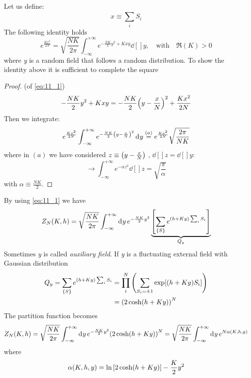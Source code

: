 \documentclass[../main/main.tex]{subfiles}
\begin{document}
Let us define:
\begin{equation}
 x \equiv \sum_{i}^{} S_i
\end{equation}
The following identity holds
\begin{equation}
  e^{\frac{K x^2}{2N}} =  \sqrt{\frac{N K}{2 \pi }} \int_{-\infty }^{+\infty } e^{-\frac{N K}{2}y^2+Kxy} \dd[]{y}, \quad \text{with} \quad \Re(K) >0
  \label{eq:11_1}
\end{equation}
where \emph{y} is a random field that follows a random distribution.
To show the identity above it is sufficient to complete the square
\begin{proof}(of \eqref{eq:11_1})
  \begin{equation}
    - \frac{N K}{2} y^2 + K x y = - \frac{N K}{2} \qty(y - \frac{x}{N})^2 + \frac{K x^2}{2N}
  \end{equation}
  Then we integrate:
  \begin{equation}
    e^{\frac{K x^2}{2N}} \int_{- \infty }^{+ \infty } e^{- \frac{N K}{2} \qty(y - \frac{x}{N})^2 } \dd[]{y} \overset{(a)}{=}  e^{\frac{K x^2}{2N}} \sqrt{\frac{2 \pi }{N K}}
  \end{equation}
  where in \( (a) \) we have considered \( z \equiv \qty( y - \frac{x}{N} )\) , \( \dd[]{z} = \dd[]{y}   \):
  \begin{equation}
    \rightarrow \int_{-\infty }^{+\infty } e^{- \alpha z^2} \dd[]{z} = \sqrt{\frac{\pi }{\alpha }}
  \end{equation}
  with \( \alpha \equiv \frac{N K}{2} \).
\end{proof}
By using \eqref{eq:11_1} we have
\begin{equation}
  Z_N (K,h)= \sqrt{\frac{N K}{2 \pi }} \int_{-\infty }^{+ \infty } \dd[]{y} e^{- \frac{NK}{2}y^2} \underbrace{\qty[\sum_{\{ S \}  }^{}  e^{(h+Ky) \sum_{i}^{} S_i  }  ]}_{Q_y}
\end{equation}
Sometimes \emph{y} is called \emph{auxiliary field}. If \emph{y} is a fluctuating external field  with Gaussian distribution
\begin{equation}
\begin{split}
 Q_y  =  \sum_{\{ S \}  }^{}  e^{(h+Ky) \sum_{i}^{} S_i  }
      &= \prod_{i}^{N} \qty(\sum_{S_i = \pm 1}^{} \exp [ (h+Ky) S_i]  )\\
      &= \qty( 2 \cosh (h+Ky))^N
\end{split}
\end{equation}
The partition function becomes
\begin{equation}
Z_N (K,h) = \sqrt{\frac{N K}{2 \pi }} \int_{- \infty }^{+ \infty } \dd[]{y} e^{- \frac{NK}{2}y^2} \qty(2 \cosh(h+Ky))^N = \sqrt{\frac{N K}{2 \pi }} \int_{-\infty }^{+\infty } \dd[]{y} e^{N \alpha (K,h,y)}
\end{equation}
where
\begin{equation}
  \alpha (K,h,y) = \ln{\qty[2 \cosh(h+Ky)] } - \frac{K}{2}y^2
\end{equation}
\end{document}
